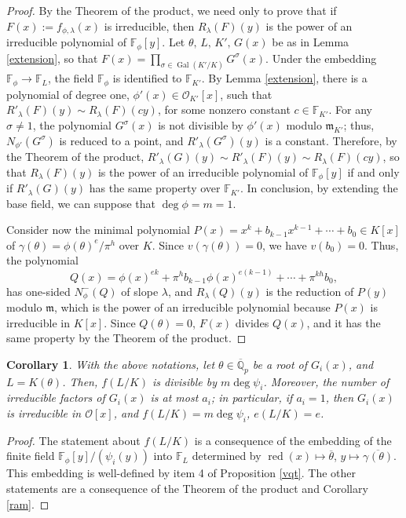 \documentclass{amsart}
\newtheorem{corollary}[theorem]{Corollary}
\def\op{\operatorname}
\def\dg{\op{deg}}
\def\ff#1{\mathbb{F}_{#1}}
\def\fph{\mathbb{F}_{\phi}}
\def\ga{\gamma}
\def\gb#1{\overline{\gamma_{#1}(\t)}}
\def\la{\lambda}
\def\lra{\longrightarrow}
\def\m{{\mathfrak m}}
\def\oo{{\mathcal O}}
\def\qpb{\overline{\mathbb{Q}}_p}
\def\rd{\op{red}}
\def\t{\theta}
\def\tb{\overline{\theta}}
\def\zpx{\oo[x]}
\begin{document}
\begin{proof}By the Theorem of the product, we need only to prove that if $F(x):=f_{\phi,\la}(x)$ is  irreducible, then $R_{\la}(F)(y)$ is the power of an irreducible polynomial of $\fph[y]$. Let $\t,\,L,\,K',\,G(x)$ be as in Lemma \ref{extension}, so that $F(x)=\prod_{\sigma\in\op{Gal}(K'/K)}G^{\sigma}(x)$. Under the embedding $\fph\lra\ff{L}$, the field $\fph$ is identified to $\ff{K'}$. By Lemma \ref{extension}, there is a polynomial of degree one, $\phi'(x)\in\oo_{K'}[x]$, such that $R'_{\la}(F)(y)\sim R_{\la}(F)(cy)$, for some nonzero constant $c\in\ff{K'}$. For any $\sigma\ne1$, the polynomial $G^{\sigma}(x)$ is not divisible by $\phi'(x)$ modulo $\m_{K'}$; thus, $N_{\phi'}(G^{\sigma})$ is reduced to a point, and $R'_{\la}(G^{\sigma})(y)$ is a constant. Therefore, by the Theorem of the product, $R'_{\la}(G)(y)\sim R'_{\la}(F)(y)\sim R_{\la}(F)(cy)$, so that $R_{\la}(F)(y)$ is the power of an irreducible polynomial of $\fph[y]$ if and only if 
$R'_{\la}(G)(y)$ has the same property over $\ff{K'}$. In conclusion, by extending the base field, we can suppose that $\dg \phi=m=1$.

Consider now the minimal polynomial
$P(x)=x^k+b_{k-1}x^{k-1}+\cdots+b_0\in K[x]$ of $\ga(\t)=\phi(\t)^e/\pi^h$ over $K$. Since $v(\ga(\t))=0$, we have $v(b_0)=0$. Thus, the polynomial
$$
Q(x)=\phi(x)^{ek}+\pi^hb_{k-1}\phi(x)^{e(k-1)}+\cdots+\pi^{kh}b_0,
$$
has one-sided $N^-_{\phi}(Q)$ of slope $\la$, and $R_{\la}(Q)(y)$ is the reduction of
$P(y)$ modulo $\m$, which is the power of an irreducible
polynomial because $P(x)$ is irreducible in $K[x]$. Since $Q(\t)=0$, $F(x)$ divides $Q(x)$, and it has the same property by the Theorem of the product.
\end{proof}

\begin{corollary}
With the above notations, let $\t\in\qpb$ be a root of $G_i(x)$, and $L=K(\t)$. Then, $f(L/K)$ is divisible by $m\dg\psi_i$. Moreover, the number of irreducible factors of $G_i(x)$ is at most $a_i$; in particular, if $a_i=1$, then $G_i(x)$ is irreducible in $\zpx$, and $f(L/K)=m\dg\psi_i$, $e(L/K)=e$.
\end{corollary}

\begin{proof}
The statement about $f(L/K)$ is a consequence of the  
embedding of the finite field $\fph[y]/(\psi_i(y))$ into $\ff{L}$ determined by $\rd(x)\mapsto \tb$, $y\mapsto \gb{}$. This embedding is well-defined by item 4 of Proposition \ref{vqt}. The other statements are a consequence of the Theorem of the product and Corollary \ref{ram}. 
\end{proof}
\end{document}
